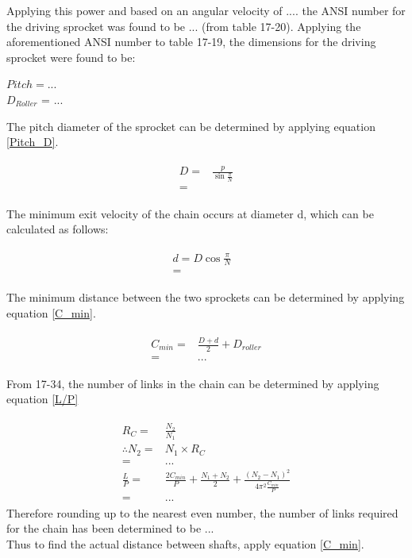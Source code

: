\documentclass[12pt]{article}
\begin{document}
Applying this power and based on an angular velocity of .... the ANSI number for the driving sprocket was found to be ... (from table 17-20). Applying the aforementioned ANSI number to table 17-19, the dimensions for the driving sprocket were found to be:
\begin{center}
$Pitch = ... $ \\
$D_{Roller}$ = ... 
\end{center}

The pitch diameter of the sprocket can be determined by applying equation \ref{Pitch_D}.

\begin{align} \label{Pitch_D}
    \begin{split}
        D =& \frac{p}{\sin{\frac{\pi}{N}}} \\
        =&
    \end{split}
\end{align}

The minimum exit velocity of the chain occurs at diameter d, which can be calculated as follows: 

\begin{align} \label{d_chain}
    \begin{split}
        d = D\cos{\frac{\pi}{N}} \\
        =&
    \end{split}
\end{align}

The minimum distance between the two sprockets can be determined by applying equation \ref{C_min}.

\begin{align} \label{C_min}
    \begin{split}
        C_{min} =& \frac{D+d}{2} + D_{roller} \\
        =& ...
    \end{split}
\end{align}

From 17-34, the number of links in the chain can be determined by applying equation \ref{L/P}

\begin{align} \label{L/P}
    \begin{split}
        R_C =& \frac{N_2}{N_1} \\
        \therefore N_2 =& N_1 \times R_C \\
        =& ... \\
        \frac{L}{P} =& \frac{2C_{min}}{P} + \frac{N_1+N_2}{2} + \frac{(N_2 - N_1)^2}{4\pi^2\frac{C_{min}}{P}} \\
        =& ...
    \end{split}
\end{align}
Therefore rounding up to the nearest even number, the number of links required for the chain has been determined to be ... \\
Thus to find the actual distance between shafts, apply equation \ref{C_min}. 
\end{document}
